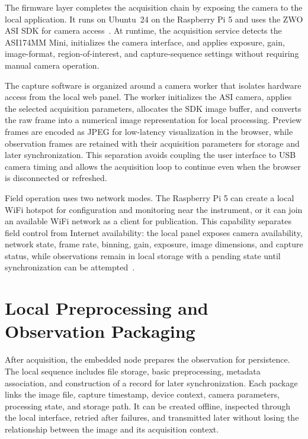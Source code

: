 \documentclass[conference,a4paper]{IEEEtran}
\begin{document}
The firmware layer completes the acquisition chain by exposing the camera to the local application. It runs on Ubuntu~24 on the Raspberry Pi 5 and uses the ZWO ASI SDK for camera access~\cite{zwoASILinuxManual}. At runtime, the acquisition service detects the ASI174MM Mini, initializes the camera interface, and applies exposure, gain, image-format, region-of-interest, and capture-sequence settings without requiring manual camera operation.

The capture software is organized around a camera worker that isolates hardware access from the local web panel. The worker initializes the ASI camera, applies the selected acquisition parameters, allocates the SDK image buffer, and converts the raw frame into a numerical image representation for local processing. Preview frames are encoded as JPEG for low-latency visualization in the browser, while observation frames are retained with their acquisition parameters for storage and later synchronization. This separation avoids coupling the user interface to USB camera timing and allows the acquisition loop to continue even when the browser is disconnected or refreshed.

Field operation uses two network modes. The Raspberry Pi 5 can create a local WiFi hotspot for configuration and monitoring near the instrument, or it can join an available WiFi network as a client for publication. This capability separates field control from Internet availability: the local panel exposes camera availability, network state, frame rate, binning, gain, exposure, image dimensions, and capture status, while observations remain in local storage with a pending state until synchronization can be attempted~\cite{nmcliHotspot2026}.


\section{Local Preprocessing and Observation Packaging}

After acquisition, the embedded node prepares the observation for persistence. The local sequence includes file storage, basic preprocessing, metadata association, and construction of a record for later synchronization. Each package links the image file, capture timestamp, device context, camera parameters, processing state, and storage path. It can be created offline, inspected through the local interface, retried after failures, and transmitted later without losing the relationship between the image and its acquisition context.
\end{document}
